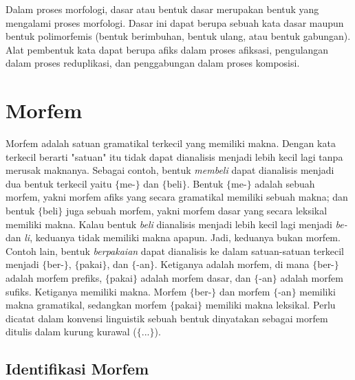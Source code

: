 Dalam proses morfologi, dasar atau bentuk dasar merupakan bentuk yang mengalami proses morfologi. Dasar ini dapat berupa sebuah kata dasar maupun bentuk polimorfemis (bentuk berimbuhan, bentuk ulang, atau bentuk gabungan). Alat pembentuk kata dapat berupa afiks dalam proses afiksasi, pengulangan dalam proses reduplikasi, dan penggabungan dalam proses komposisi. 



\section{Morfem}
\label{sec:morfem}

Morfem adalah satuan gramatikal terkecil yang memiliki makna\cite{chaer:08:morfologi}. Dengan kata terkecil berarti "satuan" itu tidak dapat dianalisis menjadi lebih kecil lagi tanpa merusak maknanya. Sebagai contoh, bentuk \textit{membeli} dapat dianalisis menjadi dua bentuk terkecil yaitu $\lbrace$me-$\rbrace$ dan $\lbrace$beli$\rbrace$. Bentuk $\lbrace$me-$\rbrace$ adalah sebuah morfem, yakni morfem afiks yang secara gramatikal memiliki sebuah makna; dan bentuk $\lbrace$beli$\rbrace$ juga sebuah morfem, yakni morfem dasar yang secara leksikal memiliki makna. Kalau bentuk \textit{beli} dianalisis menjadi lebih kecil lagi menjadi \textit{be-} dan \textit{li}, keduanya tidak memiliki makna apapun. Jadi, keduanya bukan morfem. Contoh lain, bentuk \textit{berpakaian} dapat dianalisis ke dalam satuan-satuan terkecil menjadi $\lbrace$ber-$\rbrace$, $\lbrace$pakai$\rbrace$, dan $\lbrace$-an$\rbrace$. Ketiganya adalah morfem, di mana $\lbrace$ber-$\rbrace$ adalah morfem prefiks, $\lbrace$pakai$\rbrace$ adalah morfem dasar, dan $\lbrace$-an$\rbrace$ adalah morfem sufiks. Ketiganya memiliki makna. Morfem $\lbrace$ber-$\rbrace$ dan morfem $\lbrace$-an$\rbrace$ memiliki makna gramatikal, sedangkan morfem $\lbrace$pakai$\rbrace$ memiliki makna leksikal. Perlu dicatat dalam konvensi linguistik sebuah bentuk dinyatakan sebagai morfem ditulis dalam kurung kurawal ($\lbrace$...$\rbrace$).


\subsection{Identifikasi Morfem}
\label{sec:identifikasiMorfem}

